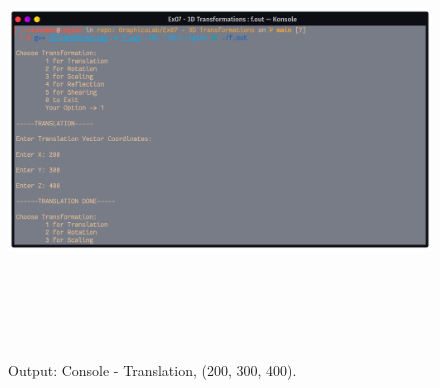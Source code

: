 \documentclass[12pt, a4]{article}
\begin{document}
\subsection*{}
\begin{figure}[h]
\centering
\caption{Output: Console - Translation, (200, 300, 400).}
\includegraphics[height=12cm, width=17cm]{Outputs/Console-1.png}
\end{figure}

\newpage
\end{document}
